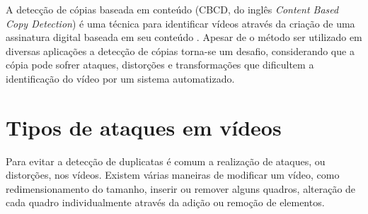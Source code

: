      
    A detecção de cópias baseada em conteúdo (CBCD, do inglês \textit{Content Based Copy Detection}) é uma técnica para identificar vídeos através da criação de uma assinatura digital baseada em seu conteúdo \citeauthor{jiang2011pku}. Apesar de o método ser utilizado em diversas aplicações a detecção de cópias torna-se um desafio, considerando que a cópia pode sofrer ataques, distorções e transformações que dificultem a identificação do vídeo por um sistema automatizado. 


         
         
         



\section{Tipos de ataques em vídeos}
\label{sec:ataques}

	Para evitar a detecção de duplicatas é comum a realização de ataques, ou distorções, nos vídeos. Existem várias maneiras de modificar um vídeo, como redimensionamento do tamanho, inserir ou remover alguns quadros, alteração de cada quadro individualmente através da adição ou remoção de elementos.

